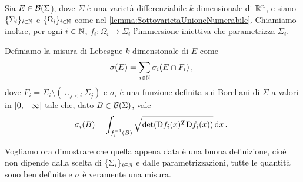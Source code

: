 \begin{definition}\label{def:MisuraKDimensionale}
	Sia $E\in\mathcal B(\Sigma$), dove $\Sigma$ è una varietà differenziabile $k$-dimensionale di $\mathbb R^n$, e siano $\{\Sigma_i\}_{i\in\mathbb N}$ e $\{\Omega_i\}_{i\in\mathbb N}$ come nel \cref{lemma:SottovarietaUnioneNumerabile}. Chiamiamo inoltre, per ogni $i\in\mathbb N$, $f_i:\Omega_i\to\Sigma_i$ l'immersione iniettiva che parametrizza $\Sigma_i$.
	
	Definiamo la misura di Lebesgue $k$-dimensionale di $E$ come
	\begin{equation*}
		\sigma(E)=\sum_{i\in\mathbb N} \sigma_i(E\cap F_i)\, \text{, }
	\end{equation*}
	dove $F_i=\Sigma_i\setminus (\cup_{j<i}\Sigma_j)$ e $\sigma_i$ è una funzione definita sui Boreliani di $\Sigma$ a valori in $[0,+\infty]$ tale che, dato $B\in\mathcal B(\Sigma)$, vale
	\begin{equation*}
		\sigma_i(B)=\int_{f_i^{-1}(B)}\sqrt{\det(\mathrm D f_i(x)^T\mathrm D f_i(x))} \,\mathrm d x\, \text{. }
	\end{equation*}

\end{definition}

Vogliamo ora dimostrare che quella appena data è una buona definizione, cioè non dipende dalla scelta di $\{\Sigma_i\}_{i\in\mathbb N}$ e dalle parametrizzazioni, tutte le quantità sono ben definite e $\sigma$ è veramente una misura.

